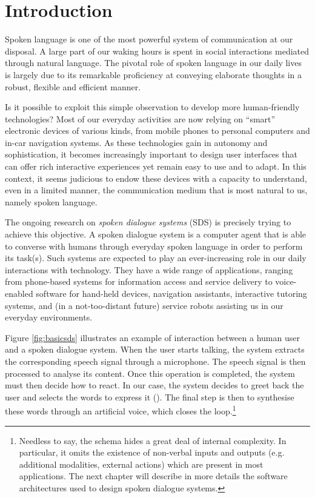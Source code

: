 
\chapter{Introduction}
\setcounter{page}{1}

Spoken language is one of the most powerful system of communication at our disposal. A large part of our waking hours is spent in social interactions mediated through natural language.  The pivotal role of spoken language in our daily lives is largely due to its remarkable proficiency at conveying elaborate thoughts in a robust, flexible and efficient manner. 

Is it possible to exploit this simple observation to develop more human-friendly technologies? Most of our everyday activities are now relying on ``smart'' electronic devices of various kinds, from mobile phones to personal computers and in-car navigation systems. As these technologies gain in autonomy and sophistication, it becomes increasingly important to design user interfaces that can offer rich interactive experiences yet remain easy to use and to adapt. In this context, it seems judicious to endow these devices with a capacity to understand, even in a limited manner, the communication medium that is most natural to us, namely spoken language.  

The ongoing research on \textit{spoken dialogue systems} (SDS) is precisely trying to achieve this objective. A spoken dialogue system is a computer agent that is able to converse with humans through everyday spoken language in order to perform its task(s). Such systems are expected to play an ever-increasing role in our daily interactions with technology. They have a wide range of applications, ranging from phone-based systems for information access and service delivery to voice-enabled software for hand-held devices, navigation assistants, interactive tutoring systems, and (in a not-too-distant future) service robots assisting us in our everyday environments.

Figure \ref{fig:basicsds} illustrates an example of interaction between a human user and a spoken dialogue system. When the user starts talking, the system extracts the corresponding speech signal through a microphone.  The speech signal is then processed to analyse its content.  Once this operation is completed, the system must then decide how to react.  In our case, the system decides to greet back the user and selects the words to express it (). The final step is then to synthesise these words through an artificial voice, which closes the loop.\footnote{ Needless to say, the schema hides a great deal of internal complexity.  In particular, it omits the existence of non-verbal inputs and outputs (e.g. additional modalities, external actions) which are present in most applications.  The next chapter will describe in more details the software architectures used to design spoken dialogue systems.}

